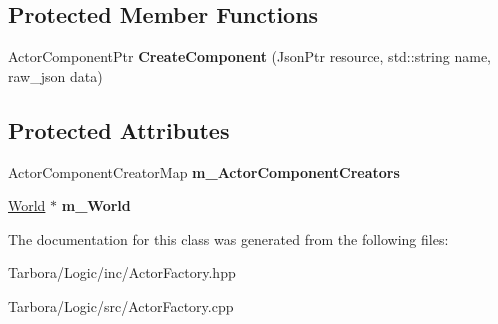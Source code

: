 \subsection*{Protected Member Functions}
\begin{DoxyCompactItemize}
\item 
\mbox{\label{classTarbora_1_1ActorFactory_a8716aaffe784609b317b5f30e5724d85}} 
Actor\+Component\+Ptr {\bfseries Create\+Component} (Json\+Ptr resource, std\+::string name, raw\+\_\+json data)
\end{DoxyCompactItemize}
\subsection*{Protected Attributes}
\begin{DoxyCompactItemize}
\item 
\mbox{\label{classTarbora_1_1ActorFactory_afdd824e4b59a45312f5edda0de93cf97}} 
Actor\+Component\+Creator\+Map {\bfseries m\+\_\+\+Actor\+Component\+Creators}
\item 
\mbox{\label{classTarbora_1_1ActorFactory_a520a8d68db2ace273c36050962e49f81}} 
\hyperlink{classTarbora_1_1World}{World} $\ast$ {\bfseries m\+\_\+\+World}
\end{DoxyCompactItemize}


The documentation for this class was generated from the following files\+:\begin{DoxyCompactItemize}
\item 
Tarbora/\+Logic/inc/Actor\+Factory.\+hpp\item 
Tarbora/\+Logic/src/Actor\+Factory.\+cpp\end{DoxyCompactItemize}
